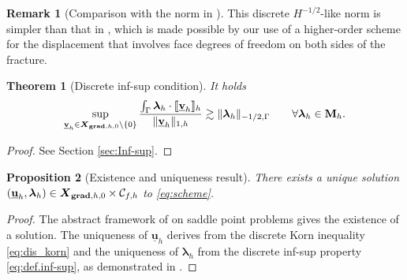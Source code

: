 \documentclass[a4paper,11pt]{article}
\newtheorem{theorem}{Theorem}[section]
\newtheorem{prop}[theorem]{Proposition}
\theoremstyle{definition}
\newtheorem{remark}{Remark}[section]
\theoremstyle{remark}
\newcommand{\uvec}[1]{\underline{\mathbf{#1}}}
\newcommand{\bo}[1]{\mathbf{#1}}
\def\cC{\mathcal{C}}
\def\blambda{\boldsymbol{\lambda}}
\def\ddgs{\boldsymbol{X}_{{\bf grad},h,0}}
\def\sjump#1{[\hskip -1.5pt[#1]\hskip -1.5pt]}
\begin{document}
\begin{remark}[Comparison with the norm in \cite{jhr}]
This discrete $H^{-1/2}$-like norm is simpler than that in \cite[Definition 4.3]{jhr}, which is made possible by our use of a higher-order scheme for the displacement that involves face degrees of freedom on both sides of the fracture.
\end{remark}

\begin{theorem}[Discrete inf-sup condition]\label{thm:inf-sup}
It holds
\begin{equation}\label{eq:def.inf-sup}
  \sup\limits_{\uvec{v}_h\in\ddgs\setminus\{0\}}\frac{\int_\Gamma \blambda_h\cdot\sjump{\uvec{v}_h}_h}{\lVert \uvec{v}_h\rVert_{1,h}}\gtrsim\lVert\blambda_h\rVert_{-1/2,\Gamma}\qquad\forall\blambda_h\in\bo{M}_h.
\end{equation}
\end{theorem}
\begin{proof}
See Section \ref{sec:Inf-sup}.
\end{proof}

\begin{prop}[Existence and uniqueness result]
There exists a unique solution $(\uvec{u}_h,\blambda_h)\in\ddgs\times\cC_{f,h}$ to \eqref{eq:scheme}.
\end{prop}
\begin{proof}
The abstract framework of \cite[Theorem 3.8]{HASLINGER1996313} on saddle point problems gives the existence of a solution. The uniqueness of $\uvec{u}_h$ derives from the discrete Korn inequality \eqref{eq:dis_korn} and the uniqueness of $\blambda_h$ from the discrete inf-sup property \eqref{eq:def.inf-sup}, as demonstrated in \cite[Proposition 4.1]{jhr}.
\end{proof}

\end{document}
